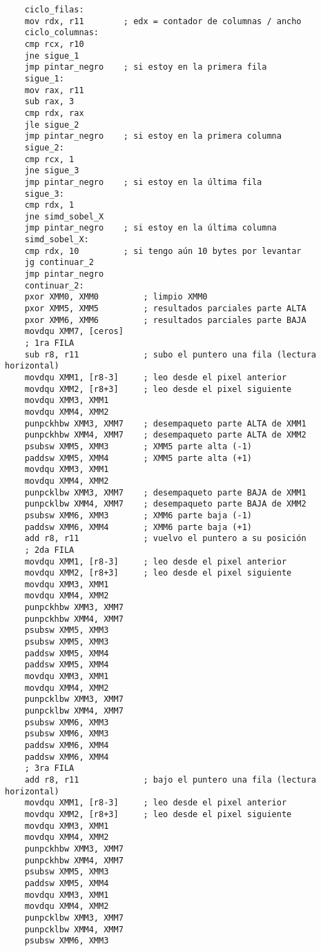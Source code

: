 \begin{verbatim}
    ciclo_filas:
    mov rdx, r11        ; edx = contador de columnas / ancho
    ciclo_columnas:
    cmp rcx, r10
    jne sigue_1
    jmp pintar_negro    ; si estoy en la primera fila
    sigue_1:
    mov rax, r11
    sub rax, 3
    cmp rdx, rax
    jle sigue_2
    jmp pintar_negro    ; si estoy en la primera columna
    sigue_2:
    cmp rcx, 1
    jne sigue_3
    jmp pintar_negro    ; si estoy en la última fila
    sigue_3:
    cmp rdx, 1
    jne simd_sobel_X
    jmp pintar_negro    ; si estoy en la última columna
    simd_sobel_X:
    cmp rdx, 10         ; si tengo aún 10 bytes por levantar
    jg continuar_2
    jmp pintar_negro
    continuar_2:
    pxor XMM0, XMM0         ; limpio XMM0
    pxor XMM5, XMM5         ; resultados parciales parte ALTA
    pxor XMM6, XMM6         ; resultados parciales parte BAJA
    movdqu XMM7, [ceros]
    ; 1ra FILA
    sub r8, r11             ; subo el puntero una fila (lectura horizontal)
    movdqu XMM1, [r8-3]     ; leo desde el pixel anterior
    movdqu XMM2, [r8+3]     ; leo desde el pixel siguiente
    movdqu XMM3, XMM1
    movdqu XMM4, XMM2
    punpckhbw XMM3, XMM7    ; desempaqueto parte ALTA de XMM1
    punpckhbw XMM4, XMM7    ; desempaqueto parte ALTA de XMM2
    psubsw XMM5, XMM3       ; XMM5 parte alta (-1)
    paddsw XMM5, XMM4       ; XMM5 parte alta (+1)
    movdqu XMM3, XMM1
    movdqu XMM4, XMM2
    punpcklbw XMM3, XMM7    ; desempaqueto parte BAJA de XMM1
    punpcklbw XMM4, XMM7    ; desempaqueto parte BAJA de XMM2
    psubsw XMM6, XMM3       ; XMM6 parte baja (-1)
    paddsw XMM6, XMM4       ; XMM6 parte baja (+1)
    add r8, r11             ; vuelvo el puntero a su posición
    ; 2da FILA
    movdqu XMM1, [r8-3]     ; leo desde el pixel anterior
    movdqu XMM2, [r8+3]     ; leo desde el pixel siguiente
    movdqu XMM3, XMM1
    movdqu XMM4, XMM2
    punpckhbw XMM3, XMM7
    punpckhbw XMM4, XMM7
    psubsw XMM5, XMM3
    psubsw XMM5, XMM3
    paddsw XMM5, XMM4
    paddsw XMM5, XMM4
    movdqu XMM3, XMM1
    movdqu XMM4, XMM2
    punpcklbw XMM3, XMM7
    punpcklbw XMM4, XMM7
    psubsw XMM6, XMM3
    psubsw XMM6, XMM3
    paddsw XMM6, XMM4
    paddsw XMM6, XMM4
    ; 3ra FILA
    add r8, r11             ; bajo el puntero una fila (lectura horizontal)
    movdqu XMM1, [r8-3]     ; leo desde el pixel anterior
    movdqu XMM2, [r8+3]     ; leo desde el pixel siguiente
    movdqu XMM3, XMM1
    movdqu XMM4, XMM2
    punpckhbw XMM3, XMM7
    punpckhbw XMM4, XMM7
    psubsw XMM5, XMM3
    paddsw XMM5, XMM4
    movdqu XMM3, XMM1
    movdqu XMM4, XMM2
    punpcklbw XMM3, XMM7
    punpcklbw XMM4, XMM7
    psubsw XMM6, XMM3

\end{verbatim}
